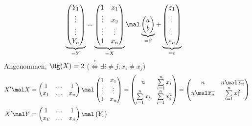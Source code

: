 \begin{beispiel}
	\begin{align*}
		\underbrace{\begin{pmatrix}
			Y_1\\
			\vdots\\
			\vdots\\
			Y_n
		\end{pmatrix}}_{=Y}
		&=\underbrace{\begin{pmatrix}
			1 & x_1\\
			\vdots & x_2\\
			\vdots & \vdots\\
			1 & x_n
		\end{pmatrix}}_{=X}\mal\underbrace{\begin{pmatrix}
			a\\
			b
		\end{pmatrix}}_{=\beta}+\underbrace{\begin{pmatrix}
			\varepsilon_1\\
			\vdots\\
			\vdots\\
			\varepsilon_n
		\end{pmatrix}}_{=\varepsilon}
	\end{align*}
	Angenommen, $\Rg(X)=2$ ($\overset{!}{\iff}\exists i\neq j:x_i\neq x_j$)
	\begin{align*}
		X'\mal X
		&=\begin{pmatrix}
			1 & \hdots & 1\\
			x_1 & \hdots & x_n
		\end{pmatrix}\mal\begin{pmatrix}
			1 & x_1\\
			\vdots &  \vdots\\
			1 & x_n
		\end{pmatrix}
		=\begin{pmatrix}
			n & \sum\limits_{i=1}^n x_i\\
			\sum\limits_{i=1}^n x_i & \sum\limits_{i=1}^n x_i^2
		\end{pmatrix}
		=\begin{pmatrix}
			n & n\mal\overline{x_n}\\
			n\mal\overline{x_n} & \sum\limits_{i=1}^n x_i^2
		\end{pmatrix}\\
		X'\mal Y
		&=\begin{pmatrix}
			1 & \hdots & 1\\
			x_1 & \hdots & x_n
		\end{pmatrix}\mal\begin{pmatrix}
			Y_1\\

\end{pmatrix}
\end{align*}
\end{beispiel}
